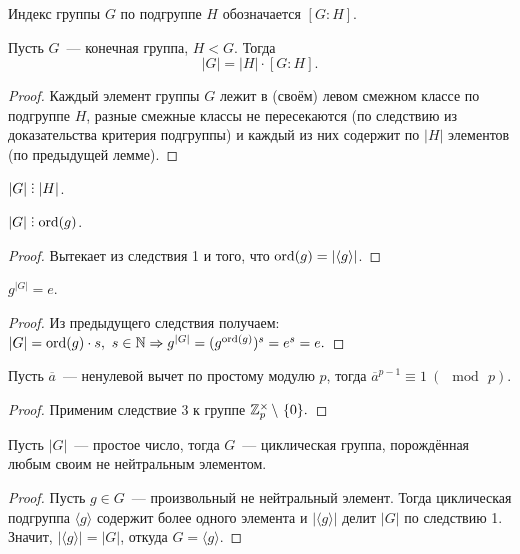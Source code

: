 	Индекс группы $G$ по подгруппе $H$ обозначается $[G : H]$.
        \newpage
	\begin{theorem*}
		Пусть $G$~--- конечная группа, $H < G$. Тогда
		\begin{equation*}
			|G| = |H| \cdot [G : H].
		\end{equation*}
	\end{theorem*}
	\begin{proof}
		Каждый элемент группы $G$ лежит в (своём) левом смежном классе по подгруппе $H$, разные смежные классы не пересекаются (по следствию из доказательства критерия подгруппы) и каждый из них содержит по $|H|$ элементов (по предыдущей лемме).
	\end{proof}
	\begin{consequence}
		$|G| \divby |H|$.
	\end{consequence}
	\begin{consequence}
		$|G| \divby \ord(g)$.
	\end{consequence}
	\begin{proof}
		Вытекает из следствия 1 и того, что $\mathrm{ord}(g) = |\langle g \rangle|$.
	\end{proof}
	\begin{consequence}
		$g^{|G|} = e$.
	\end{consequence}
	\begin{proof}
		Из предыдущего следствия получаем: ${|G| = \mathrm{ord}(g) \cdot s, \ s \in \mathbb{N}} \Rightarrow g^{|G|} = (g^{\mathrm{ord}(g)})^s = e^s = e.$
	\end{proof}
	\begin{consequence}
		Пусть $\overline{a}$~--- ненулевой вычет по простому модулю $p$, тогда $\overline{a}^{p-1} \equiv 1 \ (\mod \, p).$
	\end{consequence}
	\begin{proof}
		Применим следствие 3 к группе $\integers_p ^ {\times} \, \backslash \ \{0\}.$ \qedhere
	\end{proof}
	\begin{consequence}
		Пусть $|G|$~--- простое число, тогда $G$~--- циклическая группа, порождённая любым своим не нейтральным элементом.
	\end{consequence}
	\begin{proof}
		Пусть $g \in G$~--- произвольный не нейтральный элемент. Тогда циклическая подгруппа $\langle g \rangle$ содержит более одного элемента и $|\langle g \rangle|$ делит $|G|$ по следствию 1. Значит, $|\langle g \rangle| = |G|$, откуда $G = \langle g \rangle$. 
	\end{proof}